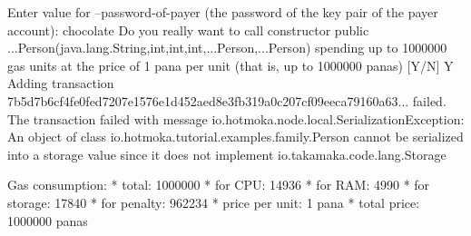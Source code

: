 \begin{shellbox}\begin{ttlst}
Enter value for --password-of-payer (the password of the key pair of the payer account): chocolate
Do you really want to call constructor
  public ...Person(java.lang.String,int,int,int,...Person,...Person)
  spending up to 1000000 gas units at the price of 1 pana per unit (that is, up to 1000000 panas) [Y/N] Y
Adding transaction 7b5d7b6cf4fe0fed7207e1576e1d452aed8e3fb319a0c207cf09eeca79160a63... failed.
The transaction failed with message io.hotmoka.node.local.SerializationException: An object of class io.hotmoka.tutorial.examples.family.Person cannot be serialized into a storage value since it does not implement io.takamaka.code.lang.Storage

Gas consumption:
 * total: 1000000
   * for CPU: 14936
   * for RAM: 4990
   * for storage: 17840
   * for penalty: 962234
 * price per unit: 1 pana
 * total price: 1000000 panas
\end{ttlst}\end{shellbox}
